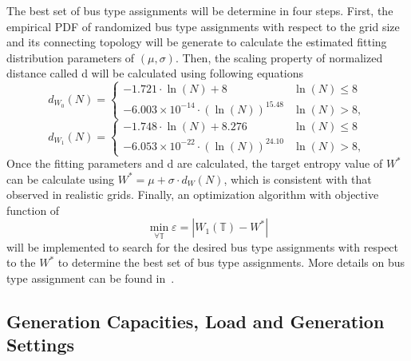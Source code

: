 \documentclass[12pt]{article}
\numberwithin{equation}{section}
\numberwithin{table}{section}
\numberwithin{figure}{section}
\begin{document}
The best set of bus type assignments will be determine in four steps. First, the empirical PDF of randomized bus type assignments with respect to the grid size and its connecting topology will be generate to calculate the estimated fitting distribution parameters of $(\mu,\sigma)$. Then, the scaling property of normalized distance called d will be calculated using following equations
\begin{equation}
d_{W_0}(N) = \begin{cases}
		-1.721 \cdot \ln(N) + 8 & \ln(N) \leq 8 \\
		-6.003 \times 10^{-14} \cdot (\ln(N))^{15.48} & \ln(N) > 8,
		\end{cases}
\end{equation}
\begin{equation}
d_{W_1}(N) = \begin{cases}
		-1.748 \cdot \ln(N) + 8.276 & \ln(N) \leq 8 \\
		-6.053 \times 10^{-22} \cdot (\ln(N))^{24.10} & \ln(N) > 8,
		\end{cases}
\end{equation}
Once the fitting parameters and d are calculated, the target entropy value of $W^*$ can be calculate using $W^*=\mu+\sigma \cdot d_W(N)$, which is consistent with that observed in realistic grids. Finally, an optimization algorithm with objective function of
\begin{equation}
\min\limits_{\forall \mathbb{T}} \varepsilon = |W_1(\mathbb{T}) - W^* |
\end{equation}
will be implemented to search for the desired bus type assignments with respect to the $W^*$ to determine the best set of bus type assignments. More details on bus type assignment can be found in~\cite{syngrid_bustype}.

\subsection{Generation Capacities, Load  and Generation Settings}
\end{document}
